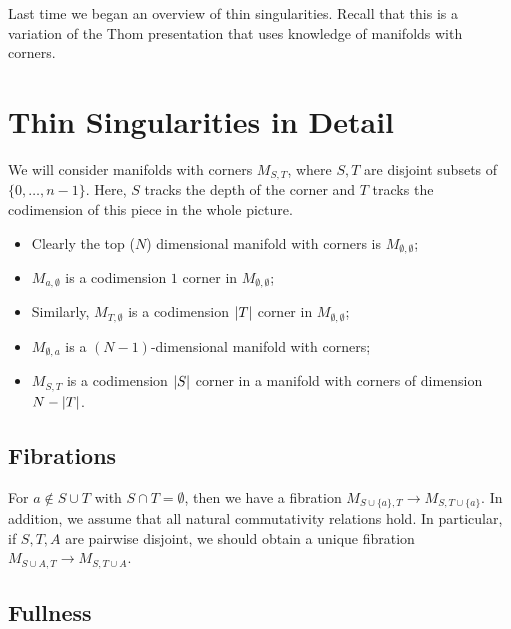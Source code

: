 \documentclass[leqno, openany]{memoir}
\theoremstyle{definition}
\theoremstyle{remark}
\theoremstyle{plain}
\theoremstyle{definition}
\theoremstyle{remark}
\begin{document}
Last time we began an overview of thin singularities. Recall that this is a
variation of the Thom presentation that uses knowledge of manifolds with
corners.

\section{Thin Singularities in Detail}%
\label{sec:thin_singularities_in_detail}

We will consider manifolds with corners $M_{S,T}$, where $S,T$ are disjoint
subsets of $\{0, \ldots, n-1 \}$. Here, $S$ tracks the depth of the corner and
$T$ tracks the codimension of this piece in the whole picture.  \begin{itemize}
    \item Clearly the top ($N$) dimensional manifold with corners is
        $M_{\emptyset, \emptyset}$; \item $M_{a, \emptyset}$ is a codimension
        $1$ corner in $M_{\emptyset, \emptyset}$; \item Similarly, $M_{T,
        \emptyset}$ is a codimension $\abs{T}$ corner in $M_{\emptyset,
    \emptyset}$; \item $M_{\emptyset, a}$ is a $(N-1)$-dimensional manifold
    with corners; \item $M_{S,T}$ is a codimension $\abs{S}$ corner in a
    manifold with corners of dimension $N - \abs{T}$.  \end{itemize}

\subsection{Fibrations}%

For $a \notin S \cup T$ with $S \cap T = \emptyset$, then we have a fibration
$M_{S \cup \{a\}, T} \to M_{S, T \cup \{a\}}$. In addition, we assume that all
natural commutativity relations hold. In particular, if $S, T, A$ are pairwise
disjoint, we should obtain a unique fibration $M_{S \cup A, T} \to M_{S, T \cup
A}$.

\subsection{Fullness}%
\end{document}
